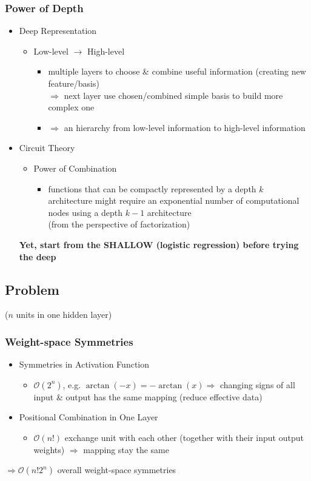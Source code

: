 \subsubsection{Power of Depth}
\begin{itemize}
\item Deep Representation
	\begin{itemize}
	\item Low-level $\rightarrow$ High-level
		\begin{itemize}	
		\item multiple layers to choose \& combine useful information (creating new feature/basis) \\
		$\Rightarrow$ next layer use chosen/combined simple basis to build more complex one
		\item $\Rightarrow$ an hierarchy from low-level information to high-level information
		\end{itemize}
	\end{itemize}

\item Circuit Theory
	\begin{itemize}
	\item Power of Combination
		\begin{itemize}
		\item functions that can be compactly represented by a depth $k$ architecture might require an exponential number of computational nodes using a depth $k-1$ architecture \\
		(from the perspective of factorization)
		\end{itemize}
	\end{itemize}
\textbf{Yet, start from the SHALLOW (logistic regression) before trying the deep}
\end{itemize}

\subsection{Problem}
($n$ units in one hidden layer)

\subsubsection{Weight-space Symmetries} 
\begin{itemize}
\item Symmetries in Activation Function
	\begin{itemize}
	\item $\mathcal{O}(2^n)$, e.g. $\arctan(-x) = -\arctan(x) \Rightarrow$ changing signs of all input \& output has the same mapping (reduce effective data)
	\end{itemize}
\item Positional Combination in One Layer
	\begin{itemize}
	\item $\mathcal{O}(n!)$ exchange unit with each other (together with their input output weights) $\Rightarrow$ mapping stay the same
	\end{itemize}
\end{itemize}
$\Rightarrow \mathcal O(n!2^n)$ overall weight-space symmetries

